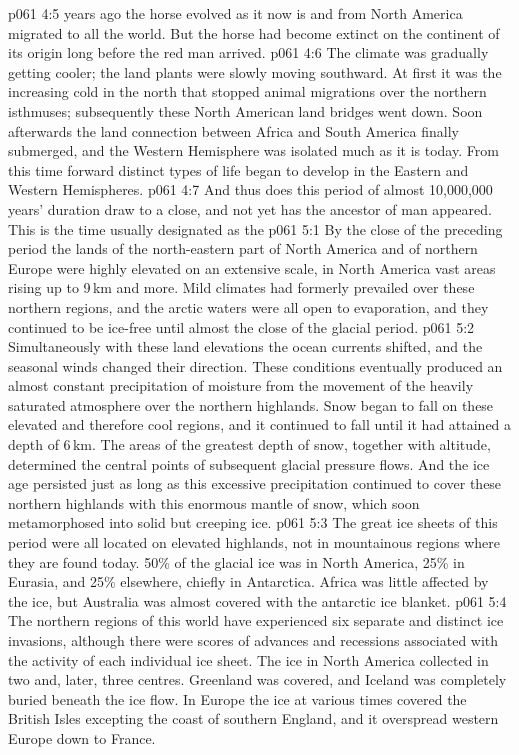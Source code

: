 \vs p061 4:5 \pc {} years ago the horse evolved as it now is and from North America migrated to all the world. But the horse had become extinct on the continent of its origin long before the red man arrived.
\vs p061 4:6 The climate was gradually getting cooler; the land plants were slowly moving southward. At first it was the increasing cold in the north that stopped animal migrations over the northern isthmuses; subsequently these North American land bridges went down. Soon afterwards the land connection between Africa and South America finally submerged, and the Western Hemisphere was isolated much as it is today. From this time forward distinct types of life began to develop in the Eastern and Western Hemispheres.
\vs p061 4:7 \pc And thus does this period of almost 10,000,000 years’ duration draw to a close, and not yet has the ancestor of man appeared. This is the time usually designated as the 
\vs p061 5:1 By the close of the preceding period the lands of the north\hyp{}eastern part of North America and of northern Europe were highly elevated on an extensive scale, in North America vast areas rising up to 9\,km and more. Mild climates had formerly prevailed over these northern regions, and the arctic waters were all open to evaporation, and they continued to be ice\hyp{}free until almost the close of the glacial period.
\vs p061 5:2 Simultaneously with these land elevations the ocean currents shifted, and the seasonal winds changed their direction. These conditions eventually produced an almost constant precipitation of moisture from the movement of the heavily saturated atmosphere over the northern highlands. Snow began to fall on these elevated and therefore cool regions, and it continued to fall until it had attained a depth of 6\,km. The areas of the greatest depth of snow, together with altitude, determined the central points of subsequent glacial pressure flows. And the ice age persisted just as long as this excessive precipitation continued to cover these northern highlands with this enormous mantle of snow, which soon metamorphosed into solid but creeping ice.
\vs p061 5:3 The great ice sheets of this period were all located on elevated highlands, not in mountainous regions where they are found today. 50\% of the glacial ice was in North America, 25\% in Eurasia, and 25\% elsewhere, chiefly in Antarctica. Africa was little affected by the ice, but Australia was almost covered with the antarctic ice blanket.
\vs p061 5:4 The northern regions of this world have experienced six separate and distinct ice invasions, although there were scores of advances and recessions associated with the activity of each individual ice sheet. The ice in North America collected in two and, later, three centres. Greenland was covered, and Iceland was completely buried beneath the ice flow. In Europe the ice at various times covered the British Isles excepting the coast of southern England, and it overspread western Europe down to France.
